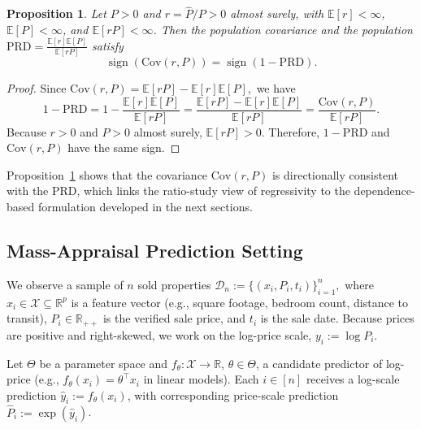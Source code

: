 \documentclass[12pt]{article}
\theoremstyle{plain}
\newtheorem{proposition}{Proposition}
\theoremstyle{definition}
\newcommand{\R}{\mathbb{R}}
\newcommand{\1}{\mathbf{1}}
\newcommand{\Cov}{\text{Cov}}
\newcommand{\D}{\mathcal{D}}
\renewcommand{\R}{\mathbb{R}}
\newcommand{\Expected}[1]{\mathbb{E}[#1]}
\begin{document}
\begin{proposition}
\label{prop:cov_prd}
Let $P>0$ and $r=\widehat P/P>0$ almost surely, with $\Expected{r}<\infty$, $\Expected{P}<\infty$, and $\Expected{rP}<\infty$. Then the population covariance  and the population
$
\mathrm{PRD}=\frac{\Expected{r}\Expected{P}}{\Expected{rP}}
$
satisfy
\begin{equation}
\label{eq:cov_prd_sign}
\operatorname{sign}\!\left(\Cov(r,P)\right)
=
\operatorname{sign}\!\left(1-\mathrm{PRD}\right).
\end{equation}
\end{proposition}

\begin{proof}
Since
$
\Cov(r,P)=\Expected{rP}-\Expected{r}\Expected{P},
$
we have
\[
1-\mathrm{PRD}
=
1-\frac{\Expected{r}\Expected{P}}{\Expected{rP}}
=
\frac{\Expected{rP}-\Expected{r}\Expected{P}}{\Expected{rP}}
=
\frac{\Cov(r,P)}{\Expected{rP}}.
\]
Because $r>0$ and $P>0$ almost surely, $\Expected{rP}>0$. Therefore, $1-\mathrm{PRD}$ and $\Cov(r,P)$ have the same sign.
\end{proof}

Proposition~\ref{prop:cov_prd} shows that the covariance $\Cov(r,P)$ is directionally consistent with the PRD, which links the ratio-study view of regressivity to the dependence-based formulation developed in the next sections.

\subsection{Mass-Appraisal Prediction Setting}
\label{subsec:prediction_setting}


We observe a sample of $n$ sold properties
$
\D_n := \{(x_i,P_i,t_i)\}_{i=1}^n,
$
where $x_i\in\mathcal X\subseteq\R^p$ is a feature vector (e.g., square footage, bedroom count, distance to transit), $P_i\in\R_{++}$ is the verified sale price, and $t_i$ is the sale date. Because prices are positive and right-skewed, we work on the log-price scale, $y_i := \log P_i$.

Let $\Theta$ be a parameter space and $f_\theta:\mathcal X\to\R$, $\theta\in\Theta$, a candidate predictor of log-price (e.g., $f_\theta(x_i)=\theta^\top x_i$ in linear models). Each $i\in[n]$ receives a log-scale prediction $\hat y_i := f_\theta(x_i)$, with corresponding price-scale prediction $\widehat P_i := \exp(\hat y_i)$.
\end{document}
